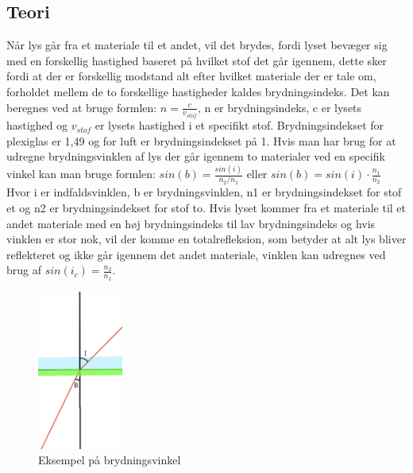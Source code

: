 \subsection{Teori}
Når lys går fra et materiale til et andet, vil det brydes, fordi lyset bevæger sig med en forskellig hastighed baseret på hvilket stof det går igennem, dette sker fordi at der er forskellig modstand alt efter hvilket materiale der er tale om, forholdet mellem de to forskellige hastigheder kaldes brydningsindeks. Det kan beregnes ved at bruge formlen: \begin{math}n = \frac{c}{v_{stof}}\end{math}, n er brydningsindeks, c er lysets hastighed og \begin{math}v_{stof}\end{math} er lysets hastighed i et specifikt stof. Brydningsindekset for plexiglas er 1,49 og for luft er brydningsindekset på 1. Hvis man har brug for at udregne brydningsvinklen af lys der går igennem to materialer ved en specifik vinkel kan man bruge formlen: \begin{math}sin(b) = \frac{sin(i)}{n_{2}/n_{1}}\end{math} eller \begin{math}sin(b) = sin(i) \cdot \frac{n_{1}}{n_{2}}\end{math}\newline
Hvor i er indfaldsvinklen, b er brydningsvinklen, n1 er brydningsindekset for stof et og n2 er brydningsindekset for stof to.\newline
Hvis lyset kommer fra et materiale til et andet materiale med en høj brydningsindeks til lav brydningsindeks og hvis vinklen er stor nok, vil der komme en totalrefleksion, som betyder at alt lys bliver reflekteret og ikke går igennem det andet materiale, vinklen kan udregnes ved brug af \begin{math}sin(i_{c}) = \frac{n_{2}}{n_{1}}\end{math}.
\begin{figure}[h!]
    \centering
    \includegraphics[width=0.25\textwidth]{figures/brydningsvinkeleksempel.png}
    \caption{Eksempel på brydningsvinkel}
\end{figure}
